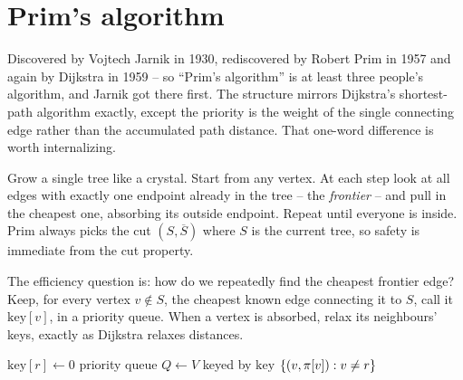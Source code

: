 \section{Prim's algorithm}

\begin{historybox}
Discovered by Vojtech Jarnik in 1930, rediscovered by Robert Prim in 1957 and again by Dijkstra in 1959 -- so ``Prim's algorithm'' is at least three people's algorithm, and Jarnik got there first. The structure mirrors Dijkstra's shortest-path algorithm exactly, except the priority is the weight of the single connecting edge rather than the accumulated path distance. That one-word difference is worth internalizing.
\end{historybox}

\begin{intuitionbox}
Grow a single tree like a crystal. Start from any vertex. At each step look at all edges with exactly one endpoint already in the tree -- the \emph{frontier} -- and pull in the cheapest one, absorbing its outside endpoint. Repeat until everyone is inside. Prim always picks the cut $(S,\overline S)$ where $S$ is the current tree, so safety is immediate from the cut property.
\end{intuitionbox}

The efficiency question is: how do we repeatedly find the cheapest frontier edge? Keep, for every vertex $v\notin S$, the cheapest known edge connecting it to $S$, call it $\mathrm{key}[v]$, in a priority queue. When a vertex is absorbed, relax its neighbours' keys, exactly as Dijkstra relaxes distances.

\begin{algorithm}[H]
\caption{Prim-MST (binary-heap version)}
\label{ch06:prim}
$\mathrm{key}[r]\gets 0$\;
priority queue $Q\gets V$ keyed by $\mathrm{key}$\;
\Return $\{(v,\pi[v]):v\ne r\}$\;
\end{algorithm}

